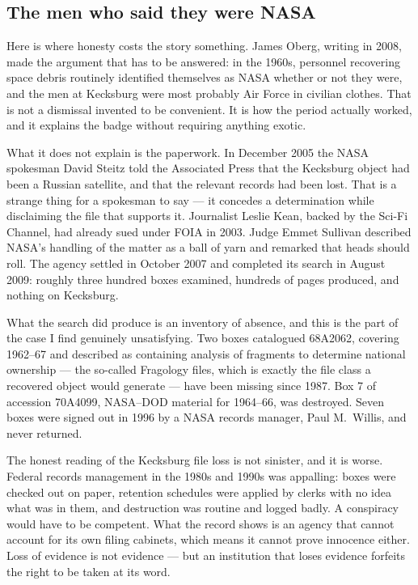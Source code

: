 \subsection*{The men who said they were NASA}

Here is where honesty costs the story something. James Oberg, writing in 2008, made the argument
that has to be answered: in the 1960s, personnel recovering space debris routinely identified
themselves as NASA whether or not they were, and the men at Kecksburg were most probably Air Force
in civilian clothes. That is not a dismissal invented to be convenient. It is how the period
actually worked, and it explains the badge without requiring anything exotic.

What it does not explain is the paperwork. In December 2005 the NASA spokesman David Steitz told
the Associated Press that the Kecksburg object had been a Russian satellite, and that the relevant
records had been lost. That is a strange thing for a spokesman to say --- it concedes a
determination while disclaiming the file that supports it. Journalist Leslie Kean, backed by the
Sci-Fi Channel, had already sued under FOIA in 2003. Judge Emmet Sullivan described NASA's handling
of the matter as a ball of yarn and remarked that heads should roll. The agency settled in October
2007 and completed its search in August 2009: roughly three hundred boxes examined, hundreds of
pages produced, and nothing on Kecksburg.

What the search did produce is an inventory of absence, and this is the part of the case I find
genuinely unsatisfying. Two boxes catalogued 68A2062, covering 1962--67 and described as containing
analysis of fragments to determine national ownership --- the so-called Fragology files, which is
exactly the file class a recovered object would generate --- have been missing since 1987. Box 7 of
accession 70A4099, NASA--DOD material for 1964--66, was destroyed. Seven boxes were signed out in
1996 by a NASA records manager, Paul M.\ Willis, and never returned.

\begin{funfact}
The honest reading of the Kecksburg file loss is not sinister, and it is worse. Federal records
management in the 1980s and 1990s was appalling: boxes were checked out on paper, retention
schedules were applied by clerks with no idea what was in them, and destruction was routine and
logged badly. A conspiracy would have to be competent. What the record shows is an agency that
cannot account for its own filing cabinets, which means it cannot prove innocence either. Loss of
evidence is not evidence --- but an institution that loses evidence forfeits the right to be taken
at its word.
\end{funfact}

